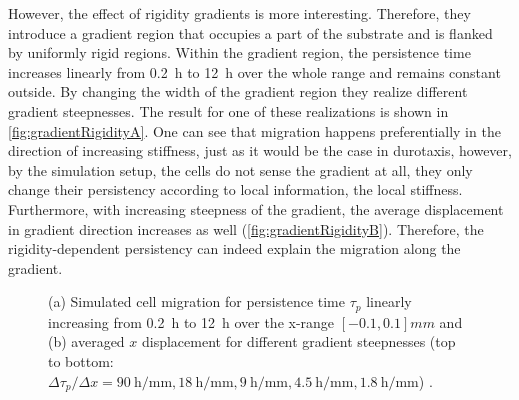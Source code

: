 However, the effect of rigidity gradients is more interesting. Therefore, they introduce a gradient region that occupies a part of the substrate and is flanked by uniformly rigid regions. Within the gradient region, the persistence time increases linearly from \SI{0.2}{\hour} to \SI{12}{\hour} over the whole range and remains constant outside. By changing the width of the gradient region they realize different gradient steepnesses. The result for one of these realizations is shown in \autoref{fig:gradientRigidityA}. One can see that migration happens preferentially in the direction of increasing stiffness, just as it would be the case in durotaxis, however, by the simulation setup, the cells do not sense the gradient at all, they only change their persistency according to local information, \ie the local stiffness. Furthermore, with increasing steepness of the gradient, the average displacement in gradient direction increases as well (\autoref{fig:gradientRigidityB}). Therefore, the rigidity-dependent persistency can indeed explain the migration along the gradient.

\begin{figure}[bth]
    \myfloatalign
     \quad
    \caption[]{(a) Simulated cell migration for persistence time $\tau_p$ linearly increasing from \SI{0.2}{\hour} to \SI{12}{\hour} over the x-range $[-0.1, 0.1] mm$ and (b) averaged $x$ displacement for different gradient steepnesses (top to bottom: $\Delta\tau_p / \Delta x = \SI{90}{\hour \per \milli\meter}, \SI{18}{\hour \per \milli\meter}, \SI{9}{\hour \per \milli\meter}, \SI{4.5}{\hour \per \milli\meter}, \SI{1.8}{\hour \per \milli\meter}$) \cite{novikova:2017}.}\label{fig:gradientRigidity}
\end{figure}

